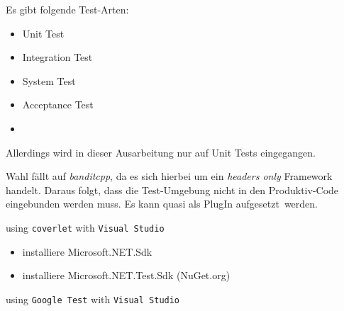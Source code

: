 


Es gibt folgende Test-Arten:
\begin{itemize}
\item Unit Test
\item Integration Test
\item System Test
\item Acceptance Test
\item {}
\end{itemize}


Allerdings wird in dieser Ausarbeitung nur auf Unit Tests eingegangen.








Wahl fällt auf \textit{banditcpp}, da es sich hierbei um ein \textit{headers only} Framework handelt.
Daraus folgt, dass die Test-Umgebung nicht in den Produktiv-Code eingebunden werden muss. Es kann quasi als PlugIn \glqq aufgesetzt\grqq\ werden.














using \texttt{coverlet} with \texttt{Visual Studio}



\begin{itemize}
\item installiere Microsoft.NET.Sdk
\item installiere Microsoft.NET.Test.Sdk (NuGet.org)



\end{itemize}


using \texttt{Google Test} with \texttt{Visual Studio}

